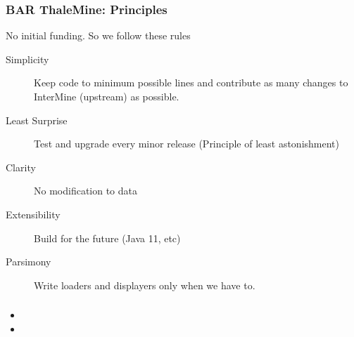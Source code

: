 \documentclass{beamer}
\begin{document}
\begin{frame}
    \frametitle{BAR ThaleMine: Principles}
    No initial funding. So we follow these rules
    \begin{description}
        \item [Simplicity] Keep code to minimum possible lines and contribute as many changes to InterMine (upstream) as possible.
        \item [Least Surprise] Test and upgrade every minor release (Principle of least astonishment)
        \item [Clarity] No modification to data
        \item [Extensibility] Build for the future (Java 11, etc)
        \item [Parsimony] Write loaders and displayers only when we have to.
    \end{description}
\end{frame}

\begin{frame}
    \frametitle{}
    \begin{itemize}
        \item
        \item
    \end{itemize}
\end{frame}
\end{document}
